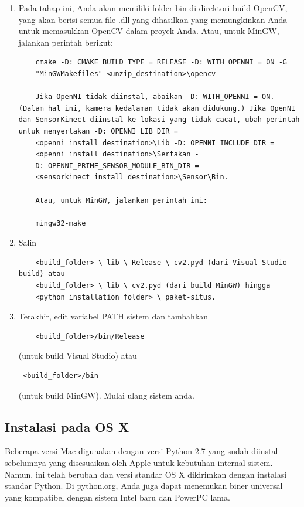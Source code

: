 \begin{enumerate}
	\item Pada tahap ini, Anda akan memiliki folder bin di direktori build OpenCV, yang akan berisi semua file .dll yang dihasilkan yang memungkinkan Anda untuk memasukkan OpenCV dalam proyek Anda. Atau, untuk MinGW, jalankan perintah berikut:
	\begin{verbatim}
	cmake -D: CMAKE_BUILD_TYPE = RELEASE -D: WITH_OPENNI = ON -G
	"MinGWMakefiles" <unzip_destination>\opencv

	Jika OpenNI tidak diinstal, abaikan -D: WITH_OPENNI = ON. (Dalam hal ini, kamera kedalaman tidak akan didukung.) Jika OpenNI dan SensorKinect diinstal ke lokasi yang tidak cacat, ubah perintah untuk menyertakan -D: OPENNI_LIB_DIR =
	<openni_install_destination>\Lib -D: OPENNI_INCLUDE_DIR =
	<openni_install_destination>\Sertakan -
	D: OPENNI_PRIME_SENSOR_MODULE_BIN_DIR =
	<sensorkinect_install_destination>\Sensor\Bin.

	Atau, untuk MinGW, jalankan perintah ini:

	mingw32-make
	\end{verbatim}
	\item Salin 
	\begin{verbatim}
	<build_folder> \ lib \ Release \ cv2.pyd (dari Visual Studio build) atau
	<build_folder> \ lib \ cv2.pyd (dari build MinGW) hingga
	<python_installation_folder> \ paket-situs.
	\end{verbatim}
	\item Terakhir, edit variabel PATH sistem dan tambahkan
	\begin{verbatim} 
	<build_folder>/bin/Release \end{verbatim}
	(untuk build Visual Studio) atau 
	\begin{verbatim} <build_folder>/bin \end{verbatim}(untuk build MinGW). Mulai ulang sistem anda.

\end{enumerate}
\newpage
\subsection{Instalasi pada OS X}

Beberapa versi Mac digunakan dengan versi Python 2.7 yang sudah diinstal sebelumnya yang disesuaikan oleh Apple untuk kebutuhan internal sistem. Namun, ini telah berubah dan versi standar OS X dikirimkan dengan instalasi standar Python. Di python.org, Anda juga dapat menemukan biner universal yang kompatibel dengan sistem Intel baru dan PowerPC lama.

